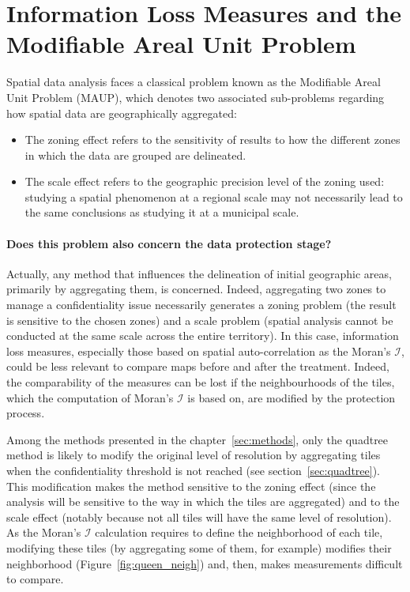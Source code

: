 \section{Information Loss Measures and the Modifiable Areal Unit Problem}


Spatial data analysis faces a classical problem known as the Modifiable Areal Unit Problem (MAUP), which denotes two associated sub-problems regarding how spatial data are geographically aggregated:

\begin{itemize}
    \item The zoning effect refers to the sensitivity of results to how the different zones in which the data are grouped are delineated.
    \item The scale effect refers to the geographic precision level of the zoning used: studying a spatial phenomenon at a regional scale may not necessarily lead to the same conclusions as studying it at a municipal scale.
\end{itemize}

\paragraph{Does this problem also concern the data protection stage?}

Actually, any method that influences the delineation of initial geographic areas, primarily by aggregating them, is concerned. Indeed, aggregating two zones to manage a confidentiality issue necessarily generates a zoning problem (the result is sensitive to the chosen zones) and a scale problem (spatial analysis cannot be conducted at the same scale across the entire territory). In this case, information loss measures, especially those based on spatial auto-correlation as the Moran’s $\mathcal{I}$, could be less relevant to compare maps before and after the treatment. Indeed, the comparability of the measures can be lost if the neighbourhoods of the tiles, which the computation of Moran's $\mathcal{I}$ is based on, are modified by the protection process.

Among the methods presented in the chapter~\ref{sec:methods}, only the quadtree method is likely to modify the original level of resolution by aggregating tiles when the confidentiality threshold is not reached (see section~\ref{sec:quadtree}). This modification makes the method sensitive to the zoning effect (since the analysis will be sensitive to the way in which the tiles are aggregated) and to the scale effect (notably because not all tiles will have the same level of resolution). As the Moran’s $\mathcal{I}$ calculation requires to define the neighborhood of each tile, modifying these tiles (by aggregating some of them, for example) modifies their neighborhood (Figure~\ref{fig:queen_neigh}) and, then, makes measurements difficult to compare.

